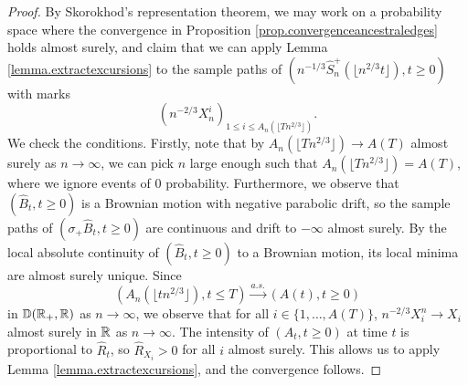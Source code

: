 \begin{proof}
By Skorokhod's representation theorem, we may work on a probability space where the convergence in Proposition \ref{prop.convergenceancestraledges} holds almost surely, and claim that we can apply Lemma \ref{lemma.extractexcursions} to the sample paths of $\left(n^{-1/3}\hat{S}^{+}_n\left(\lfloor n^{2/3}t\rfloor\right),t \geq 0\right)$ with marks $$\left(n^{-2/3}X_n^i\right)_{1\leq i\leq A_n\left(\lfloor T n^{2/3}\rfloor\right)}.$$ We check the conditions.
Firstly, note that by $A_n\left(\lfloor T n^{2/3}\rfloor\right)\to A\left(T\right)$ almost surely as $n\to \infty$, we can pick $n$ large enough such that $A_n\left(\lfloor T n^{2/3}\rfloor\right)=A\left(T\right)$, where we ignore events of $0$ probability. Furthermore, we observe that $(\hat{B}_t,t\geq 0)$ is a Brownian motion with negative parabolic drift, so the sample paths of $(\sigma_+\hat{B}_t,t\geq 0)$ are continuous and drift to $-\infty$ almost surely. By the local absolute continuity of $(\hat{B}_t,t\geq 0)$ to a Brownian motion, its local minima are almost surely unique. Since
$$\left(A_n\left(\lfloor t n^{2/3}\rfloor\right), t\leq T\right) \overset{a.s.}{\to}\left(A\left(t\right),t\geq 0\right)$$
in ${\mathbb D}({\mathbb R}_+,{\mathbb R})$ as $n\to \infty$, we observe that for all $i\in \{1,\dots,A(T)\}$, $n^{-2/3}X_i^n\to X_i$ almost surely in ${\mathbb R}$ as $n\to \infty$. The intensity of $(A_t,t\geq 0)$ at time $t$ is proportional to $\hat{R}_t$, so $\hat{R}_{X_i}>0$ for all $i$ almost surely. This allows us to apply Lemma \ref{lemma.extractexcursions}, and the convergence follows.
\end{proof}

